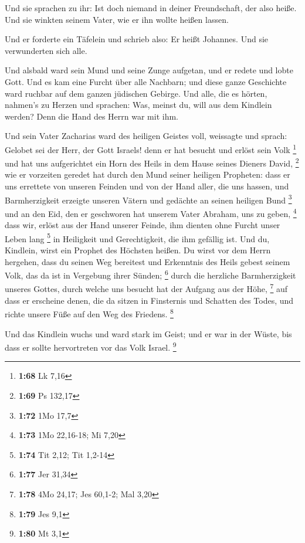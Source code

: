  Und sie sprachen zu ihr: Ist doch niemand in deiner
Freundschaft, der also heiße.  Und sie winkten seinem
Vater, wie er ihn wollte heißen lassen.

 Und er forderte ein Täfelein und schrieb also: Er heißt
Johannes. Und sie verwunderten sich alle.

 Und alsbald ward sein Mund und seine Zunge aufgetan, und
er redete und lobte Gott.  Und es kam eine Furcht über alle
Nachbarn; und diese ganze Geschichte ward ruchbar auf dem ganzen
jüdischen Gebirge.  Und alle, die es hörten, nahmen's zu
Herzen und sprachen: Was, meinst du, will aus dem Kindlein werden? Denn
die Hand des Herrn war mit ihm.

 Und sein Vater Zacharias ward des heiligen Geistes voll,
weissagte und sprach:  Gelobet sei der Herr, der Gott
Israels! denn er hat besucht und erlöst sein Volk \footnote{\textbf{1:68}
  Lk 7,16}  und hat uns aufgerichtet ein Horn des Heils in
dem Hause seines Dieners David, \footnote{\textbf{1:69} Ps 132,17}
 wie er vorzeiten geredet hat durch den Mund seiner
heiligen Propheten:  dass er uns errettete von unseren
Feinden und von der Hand aller, die uns hassen,  und
Barmherzigkeit erzeigte unseren Vätern und gedächte an seinen heiligen
Bund \footnote{\textbf{1:72} 1Mo 17,7}  und an den Eid, den
er geschworen hat unserem Vater Abraham, uns zu geben, \footnote{\textbf{1:73}
  1Mo 22,16-18; Mi 7,20}  dass wir, erlöst aus der Hand
unserer Feinde, ihm dienten ohne Furcht unser Leben lang \footnote{\textbf{1:74}
  Tit 2,12; Tit 1,2-14}  in Heiligkeit und Gerechtigkeit,
die ihm gefällig ist.  Und du, Kindlein, wirst ein Prophet
des Höchsten heißen. Du wirst vor dem Herrn hergehen, dass du seinen Weg
bereitest  und Erkenntnis des Heils gebest seinem Volk, das
da ist in Vergebung ihrer Sünden; \footnote{\textbf{1:77} Jer 31,34}
 durch die herzliche Barmherzigkeit unseres Gottes, durch
welche uns besucht hat der Aufgang aus der Höhe, \footnote{\textbf{1:78}
  4Mo 24,17; Jes 60,1-2; Mal 3,20}  auf dass er erscheine
denen, die da sitzen in Finsternis und Schatten des Todes, und richte
unsere Füße auf den Weg des Friedens. \footnote{\textbf{1:79} Jes 9,1}

 Und das Kindlein wuchs und ward stark im Geist; und er war
in der Wüste, bis dass er sollte hervortreten vor das Volk Israel.
\footnote{\textbf{1:80} Mt 3,1}


